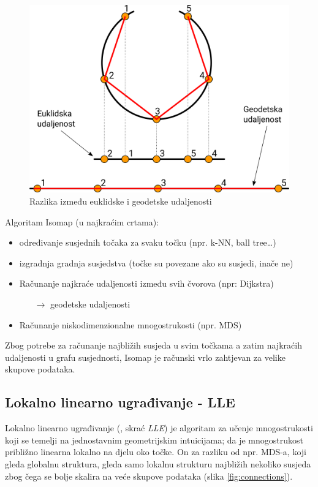 \documentclass[times, utf8, diplomski]{fer}
\begin{document}
\begin{figure}[htb]
    \centering
    \includegraphics[width=12cm]{resources/images/reduction/euclid_vs_geodetic.png}
    \caption{Razlika između euklidske i geodetske udaljenosti}
    \label{fig:euclid_vs_geodetic}
\end{figure}

Algoritam Isomap (u najkraćim crtama):
\begin{itemize}
    \item određivanje susjednih točaka za svaku točku (npr. k-NN, ball tree\dots)
    \item izgradnja gradnja susjedstva (točke su povezane ako su susjedi, inače ne)
    \item Računanje najkraće udaljenosti između svih čvorova (npr: Dijkstra)
          \begin{itemize}
              \item[$\rightarrow$] geodetske udaljenosti
          \end{itemize}
    \item Računanje niskodimenzionalne mnogostrukosti (npr. MDS)
\end{itemize}

\bigskip
Zbog potrebe za računanje najbližih susjeda u svim točkama a zatim najkraćih udaljenosti u grafu susjednosti, Isomap je računski vrlo zahtjevan za velike skupove podataka.

\subsection{Lokalno linearno ugrađivanje - LLE}
Lokalno linearno ugrađivanje (, skrać \emph{LLE}) je algoritam za učenje mnogostrukosti koji se temelji na jednostavnim geometrijskim intuicijama; da je mnogostrukost približno linearna lokalno na djelu oko točke. On za razliku od npr. MDS-a, koji gleda globalnu struktura, gleda samo lokalnu strukturu najbližih nekoliko susjeda zbog čega se bolje skalira na veće skupove podataka (slika \ref{fig:connections}).
\end{document}
